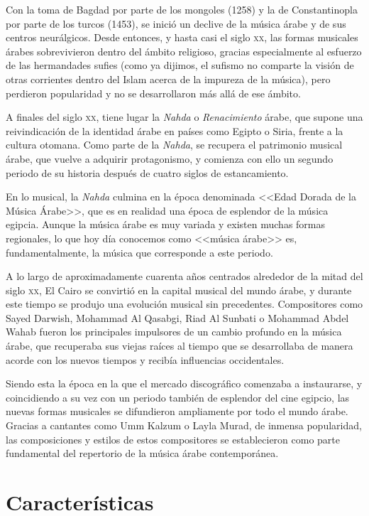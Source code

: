    Con la toma de Bagdad por parte de los mongoles (1258) y la de Constantinopla por parte de los turcos (1453), se inició un declive de la música árabe y de sus centros neurálgicos. Desde entonces, y hasta casi el siglo \textsc{xx}, las formas musicales árabes sobrevivieron dentro del ámbito religioso, gracias especialmente al esfuerzo de las hermandades sufies (como ya dijimos, el sufismo no comparte la visión de otras corrientes dentro del Islam acerca de la impureza de la música), pero perdieron popularidad y no se desarrollaron más allá de ese ámbito.

    A finales del siglo \textsc{xx}, tiene lugar la \emph{Nahda} o \emph{Renacimiento} árabe, que supone una reivindicación de la identidad árabe en países como Egipto o Siria, frente a la cultura otomana. Como parte de la \emph{Nahda}, se recupera el patrimonio musical árabe, que vuelve a adquirir protagonismo, y comienza con ello un segundo periodo de su historia después de cuatro siglos de estancamiento.

    En lo musical, la \emph{Nahda} culmina en la época denominada <<Edad Dorada de la Música Árabe>>, que es en realidad una época de esplendor de la música egipcia. Aunque la música árabe es muy variada y existen muchas formas regionales, lo que hoy día conocemos como <<música árabe>> es, fundamentalmente, la música que corresponde a este periodo.

    A lo largo de aproximadamente cuarenta años centrados alrededor de la mitad del siglo \textsc{xx}, El Cairo se convirtió en la capital musical del mundo árabe, y durante este tiempo se produjo una evolución musical sin precedentes. Compositores como Sayed Darwish, Mohammad Al Qasabgi, Riad Al Sunbati o Mohammad Abdel Wahab fueron los principales impulsores de un cambio profundo en la música árabe, que recuperaba sus viejas raíces al tiempo que se desarrollaba de manera acorde con los nuevos tiempos y recibía influencias occidentales.

    Siendo esta la época en la que el mercado discográfico comenzaba a instaurarse, y coincidiendo a su vez con un periodo también de esplendor del cine egipcio, las nuevas formas musicales se difundieron ampliamente por todo el mundo árabe. Gracias a cantantes como Umm Kalzum o Layla Murad, de inmensa popularidad, las composiciones y estilos de estos compositores se establecieron como parte fundamental del repertorio de la música árabe contemporánea.


    \section{Características}

